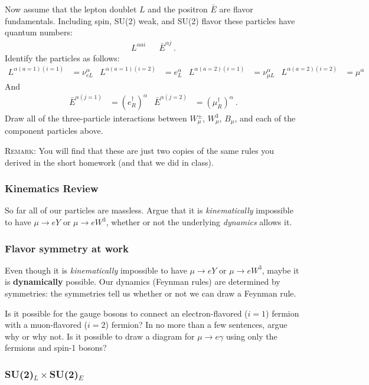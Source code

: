 \documentclass[12pt]{article}
\begin{document}
Now assume that the lepton doublet $L$ and the positron $\bar E$ are flavor fundamentals. Including spin, SU(2) weak, and SU(2) flavor these particles have quantum numbers:
\begin{align}
	L^{\alpha a i} && \bar E^{\alpha j} \ .
\end{align}
Identify the particles as follows:
\begin{align}
	L^{\alpha(a=1)(i=1)} &= \nu_{eL}^\alpha
	&
	L^{\alpha(a=1)(i=2)} &= e_L^\alpha
	&
	L^{\alpha(a=2)(i=1)} &= \nu_{\mu L}^\alpha
	&
	L^{\alpha(a=2)(i=2)} &= \mu^\alpha
\end{align}
And
\begin{align}
	\bar E^{\alpha(j=1)} &= \left(e_R^\dag\right)^\alpha
	&
	\bar E^{\alpha(j=2)} &= \left(\mu_R^\dag\right)^\alpha \ .
\end{align}
Draw all of the three-particle interactions between $W^\pm_\mu$, $W^3_\mu$, $B_\mu$, and each of the component particles above. 

\textsc{Remark}: You will find that these are just two copies of the same rules you derived in the short homework (and that we did in class). 

\subsubsection{Kinematics Review}

So far all of our particles are massless. Argue that it is \emph{kinematically} impossible to have $\mu \to e Y$ or $\mu \to e W^3$, whether or not the underlying \emph{dynamics} allows it.

\subsubsection{Flavor symmetry at work}

Even though it is \emph{kinematically} impossible to have $\mu \to e Y$ or $\mu \to e W^3$, maybe it is \textbf{dynamically} possible. Our dynamics (Feynman rules) are determined by symmetries: the symmetries tell us whether or not we can draw a Feynman rule.

Is it possible for the gauge bosons to connect an electron-flavored ($i=1$) fermion with a muon-flavored ($i=2$) fermion? In no more than a few sentences, argue why or why not. Is it possible to draw a diagram for $\mu \to e \gamma$ using only the fermions and spin-1 bosons?


\subsubsection{SU(2)$_L\times$SU(2)$_E$}
\end{document}
